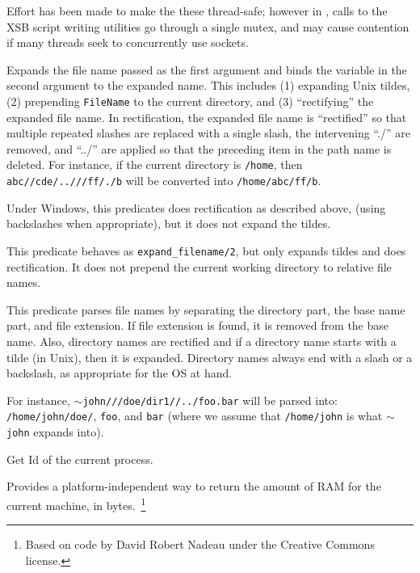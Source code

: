 Effort has been made to make the these thread-safe; however in
\version, calls to the XSB script writing utilities go through a
single mutex, and may cause contention if many threads seek to
concurrently use sockets.

\begin{description}
%
Expands the file name passed as the first argument and binds the
variable in the second argument to the expanded name. This includes
(1) expanding Unix tildes, (2) prepending {\tt FileName} to the
current directory, and (3) ``rectifying'' the expanded file name.  In
rectification, the expanded file name is ``rectified'' so that
multiple repeated slashes are replaced with a single slash, the
intervening ``./'' are removed, and ``../'' are applied so that the
preceding item in the path name is deleted. For instance, if the
current directory is {\tt /home}, then {\tt abc//cde/..///ff/./b} will
be converted into {\tt /home/abc/ff/b}.

Under Windows, this predicates does rectification as described above,
(using backslashes when appropriate), but it does not expand the
tildes.

This predicate behaves as {\tt expand\_filename/2}, but only expands
tildes and does rectification. It does not prepend the current working
directory to relative file names.

This predicate parses file names by separating the directory part, the base
name part, and file extension. If file extension is found, it is removed
from the base name. Also, directory names are rectified and if a directory
name starts with a tilde (in Unix), then it is expanded. Directory names
always end with a slash or a backslash, as appropriate for the OS at hand.

For instance, {\tt $\sim$john///doe/dir1//../foo.bar} will be parsed into:
{\tt /home/john/doe/}, {\tt foo}, and {\tt bar} (where we assume that    
{\tt /home/john} is what {\tt $\sim$john} expands into).  

%
Get Id of the current process.

%
Provides a platform-independent way to return the amount of RAM for
the current machine, in bytes.~\footnote{Based on code by David Robert
  Nadeau under the Creative Commons license.}

\end{description}

